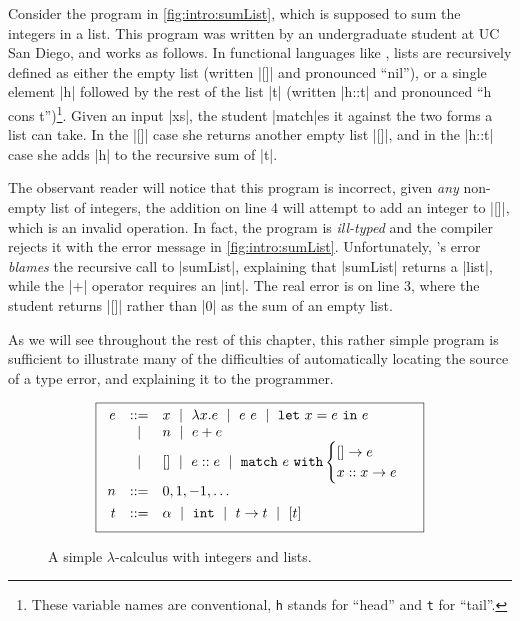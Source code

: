 Consider the \ocaml program in \autoref{fig:intro:sumList}, which is
supposed to sum the integers in a list.
%
This program was written by an undergraduate student at UC San Diego,
and works as follows.
%
In functional languages like \ocaml, lists are recursively defined as
either the empty list (written |[]| and pronounced ``nil''), or a single
element |h| followed by the rest of the list |t| (written |h::t| and
pronounced ``h cons t'')\footnote{These variable names are conventional,
  \texttt{h} stands for ``head'' and \texttt{t} for ``tail''.}.
%
Given an input |xs|, the student |match|es it against the
two forms a list can take.
%
In the |[]| case she returns another empty list |[]|, and in the
|h::t| case she adds |h| to the recursive sum of |t|.

The observant reader will notice that this program is incorrect, given
\emph{any} non-empty list of integers, the addition on line 4 will
attempt to add an integer to |[]|, which is an invalid operation.
%
In fact, the program is \emph{ill-typed} and the \ocaml compiler rejects
it with the error message in \autoref{fig:intro:sumList}.
%
Unfortunately, \ocaml's error \emph{blames} the recursive call to
|sumList|, explaining that |sumList| returns a |list|, while the |+|
operator requires an |int|.
%
The real error is on line 3, where the student returns |[]| rather than
|0| as the sum of an empty list.

As we will see throughout the rest of this chapter, this rather simple
program is sufficient to illustrate many of the difficulties of
automatically locating the source of a type error, and explaining it to
the programmer.

\begin{figure}[t]
\centering
\[
\boxed{
\begin{array}{rcl}
e & ::=    & x \spmid \efun{x}{e} \spmid \eapp{e}{e} \spmid \elet{x}{e}{e} \\
  & \spmid & n \spmid \eplus{e}{e}\\
  & \spmid & \enil \spmid \econs{e}{e} \spmid \elcase{e}{e}{x}{x}{e} \\[0.05in]

n & ::= &  0, 1, -1, \ldots \\[0.05in]


t & ::= & \alpha \spmid %
          \tint \spmid \tarr{t}{t} \spmid %
          \tlist{t} \\[0.05in]
\end{array}
}
\]
\caption{A simple $\lambda$-calculus with integers and lists.}
\label{fig:intro:simple-lambda}
\end{figure}


